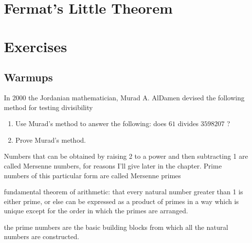 \section{Fermat's Little Theorem}


\newpage
\section*{Exercises}
\subsection*{Warmups}
\begin{exc}\label{ex:elem-num:1}
In 2000 the Jordanian mathematician, Murad A. AlDamen devised the following method for testing divisibility
\begin{enumerate}
\item Use Murad's method to answer the following: does $61$ divides $3598207$ ?
\item Prove Murad's method.
\end{enumerate}
\end{exc}

\theendnotes

Numbers that can be obtained by raising 2 to a power and then subtracting 1 are called Mersenne numbers, for reasons I’ll give later in the chapter. Prime numbers of this particular form are called Mersenne primes 

fundamental theorem of arithmetic: that every natural number greater than 1 is either prime, or else can be expressed as a product of primes in a way which is unique except for the order in which the primes are arranged.

the prime numbers are the basic building blocks from which all the natural numbers are constructed.

